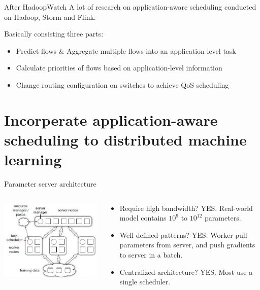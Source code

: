\documentclass{beamer}
\begin{document}
\begin{frame}{After HadoopWatch}
A lot of research on application-aware scheduling conducted on Hadoop, Storm and Flink.

Basically consisting three parts:
\begin{itemize}
    \item Predict flows \& Aggregate multiple flows into an application-level task
    \item Calculate priorities of flows based on application-level information
    \item Change routing configuration on switches to achieve QoS scheduling
\end{itemize}
\end{frame}

\section{Incorperate application-aware scheduling to distributed machine learning}
\begin{frame}{Parameter server architecture}
\begin{columns}
    \begin{column}{0.5\linewidth}
        \centering
        \includegraphics[scale=.35]{parameter-server.jpg}
    \end{column}
    \begin{column}{0.5\linewidth}
        \begin{itemize}
            \item Require high bandwidth? YES. Real-world model contains $10^9$ to $10^{12}$ parameters. \footnotemark
            \item Well-defined patterns? YES. Worker pull parameters from server, and push gradients to server in a batch.
            \item Centralized architecture? YES. Most use a single scheduler.
        \end{itemize}
    \end{column}
\end{columns}

\end{frame}
\end{document}

